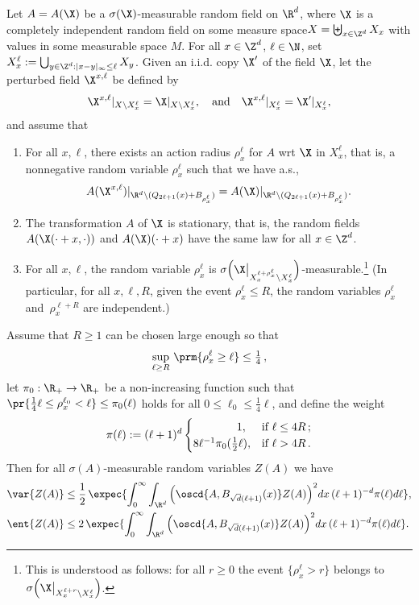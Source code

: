 \begin{theo}\label{th:ar-rpm}
Let $A=A(\X)$ be a $\sigma(\X)$-measurable random field on $\R^d$, where $\X$ is a completely independent random field on some measure space\linebreak$X=\biguplus_{x\in\Z^d}X_{x}$ with values in some measurable space $M$. For all $x\in\Z^d$, $\ell\in\N$, set $X_x^\ell:=\bigcup_{y\in\Z^d:|x-y|_\infty\le\ell}X_y$. Given an i.i.d. copy $\X'$ of the field $\X$, let the perturbed field $\X^{x,\ell}$ be defined by
\[
\X^{x,\ell}|_{X\setminus X_x^\ell}=\X|_{X\setminus X_x^\ell},\quad\text{and}\quad\X^{x,\ell}|_{X_x^\ell}=\X'|_{X_x^\ell},
\]
and assume that
\begin{enumerate}\alphenumi
\item \label{theo-2.8.1}For all $x,\ell$, there exists an action radius $\rho_x^\ell$ for $A$ wrt $\X$ in $X_x^\ell$, that is, a nonnegative random variable $\rho_x^\ell$ such that we have a.s.,
\[
A(\X^{x,\ell})|_{\R^d\setminus (Q_{2\ell+1}(x)+B_{\rho_x^\ell})}=A(\X)|_{\R^d\setminus (Q_{2\ell+1}(x)+B_{\rho_x^\ell})}.
\]
\item \label{theo-2.8.2}The transformation $A$ of $\X$ is stationary, that is, the random fields $A(\X\linebreak(\cdot+x,\cdot))$ and $A(\X)(\cdot+x)$ have the same law for all $x\in\Z^d$.
\item \label{theo-2.8.3}For all $x,\ell$, the random variable $\rho_x^\ell$ is $\sigma\Big(\X\big|_{X_x^{\ell+\rho_x^\ell}\setminus X_x^\ell}\Big)$-measurable.\footnote{This is understood as follows: for all $r\ge0$ the event $\{\rho_x^\ell>r\}$ belongs to $\sigma\Big(\X\big|_{X_x^{\ell+r}\setminus X_x^\ell}\Big)$.}
(In particular, for all $x,\ell,R$, given the event $\rho_x^\ell\le R$, the random variables $\rho_x^\ell$ and~$\rho_x^{\ell+R}$ are independent.)
\end{enumerate}
Assume that $R\ge1$ can be chosen large enough so that
\begin{align}\label{eq:choice-R}
\sup_{\ell\ge R}\,\prm{\rho_x^\ell\ge\ell}\le\tfrac14\,,
\end{align}
let $\pi_0:\R_+\to\R_+$ be a non-increasing function such that $\pr{\frac14\ell\le\rho_x^{\ell_0}<\ell}\le\pi_0(\ell)$ holds for all $0\le\ell_0\le\frac14\ell$, and define the weight 
\[
\pi(\ell):=(\ell+1)^{d}
\begin{cases}
\mkern70mu1,&\text{if }\ell\le 4R\,;\\8\ell^{-1}\pi_0(\frac12\ell),&\text{if }\ell>4R\,.
\end{cases}
\]
Then for all $\sigma(A)$-measurable random variables $Z(A)$ we have
\begin{align}
\var{Z(A)}&\le\frac12\,\expec{\int_0^\infty\int_{\R^d}{\Big(\oscd{A,B_{\sqrt d(\ell+1)}(x)}Z(A)\Big)^2}dx\,(\ell+1)^{-d}\pi(\ell) d\ell},\label{eq:AG-SG}
\\
\ent{Z(A)}&\le2\,\expec{\int_0^\infty\int_{\R^d}{\Big(\oscd{A,B_{\sqrt d(\ell+1)}(x)}Z(A)\Big)^2}dx\,(\ell+1)^{-d}\pi(\ell) d\ell}.\label{eq:AG-LSI}
\end{align}

\end{theo}


